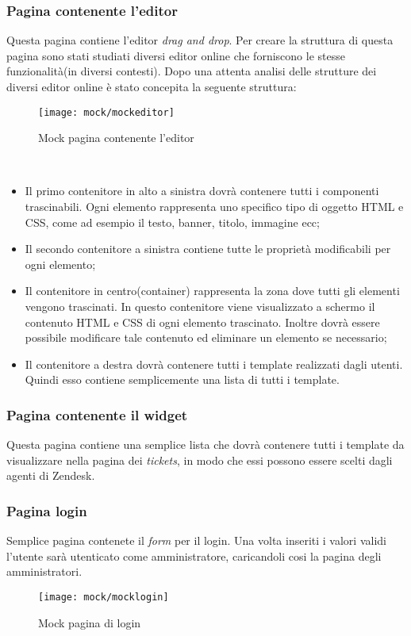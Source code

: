 \subsubsection{Pagina contenente l'editor}
Questa pagina contiene l'editor \emph{drag and drop}. Per creare la struttura di questa pagina sono stati studiati diversi editor online che forniscono le stesse funzionalità(in diversi contesti). Dopo una attenta analisi delle strutture dei diversi editor online è stato concepita la seguente struttura:
\begin{figure}[!h] 
	\centering 
	\texttt{[image: mock/mockeditor]} 
	\caption{Mock pagina contenente l'editor}
\end{figure}  
\\
\begin{itemize}
	\item Il primo contenitore in alto a sinistra dovrà contenere tutti i componenti trascinabili. Ogni elemento rappresenta uno specifico tipo di oggetto HTML e CSS, come ad esempio il testo, banner, titolo, immagine ecc;
	\item Il secondo contenitore a sinistra contiene tutte le proprietà modificabili per ogni elemento;
	\item Il contenitore in centro(container) rappresenta la zona dove tutti gli elementi vengono trascinati. In questo contenitore viene visualizzato a schermo il contenuto HTML e CSS di ogni elemento trascinato. Inoltre dovrà essere possibile modificare tale contenuto ed eliminare un elemento se necessario;
	\item Il contenitore a destra dovrà contenere tutti i template realizzati dagli utenti. Quindi esso contiene semplicemente una lista di tutti i template.  
\end{itemize}

\subsubsection{Pagina contenente il widget} Questa pagina contiene una semplice lista che dovrà contenere tutti i template da visualizzare nella pagina dei \emph{tickets}, in modo che essi possono essere scelti dagli agenti di Zendesk.
\\ 
\subsubsection{Pagina login}
Semplice pagina contenete il \emph{form} per il login. Una volta inseriti i valori validi l'utente sarà utenticato come amministratore, caricandoli cosi la pagina degli amministratori. 
\begin{figure}[!h] 
	\centering 
	\texttt{[image: mock/mocklogin]} 
	\caption{Mock pagina di login}
\end{figure}  \newpage
